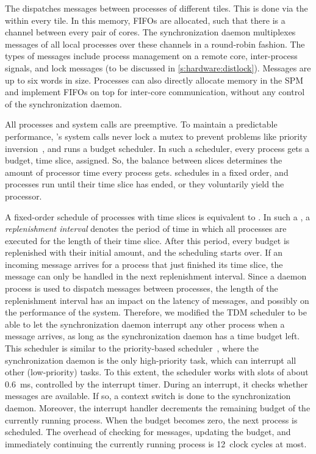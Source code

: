 The  dispatches messages between processes of different tiles.
This is done via the  within every tile.
In this memory, \acp{FIFO} are allocated, such that there is a channel between every pair of cores.
The synchronization daemon multiplexes messages of all local processes over these channels in a round-robin fashion.
The types of messages include process management on a remote core, inter-process signals, and lock messages (to be discussed in \cref{s:hardware:distlock}).
Messages are up to six words in size.
Processes can also directly allocate memory in the \ac{SPM} and implement \acp{FIFO} on top for inter-core communication, without any control of the synchronization daemon.

All processes and system calls are preemptive.
To maintain a predictable performance, \Helix's system calls never lock a mutex to prevent problems like priority inversion~\cite{sha:priority}, and \Helix runs a budget scheduler.
In such a scheduler, every process gets a budget, \ie time slice, assigned.
So, the balance between slices determines the amount of processor time every process gets.
\Helix schedules in a fixed order, and processes run until their time slice has ended, or they voluntarily yield the processor.

A fixed-order schedule of processes with time slices is equivalent to .
In such a , a \emph{replenishment interval} denotes the period of time in which all processes are executed for the length of their time slice.
After this period, every budget is replenished with their initial amount, and the scheduling starts over.
If an incoming message arrives for a process that just finished its time slice, the message can only be handled in the next replenishment interval.
Since a daemon process is used to dispatch messages between processes, the length of the replenishment interval has an impact on the latency of messages, and possibly on the performance of the system.
Therefore, we modified the \ac{TDM} scheduler to be able to let the synchronization daemon interrupt any other process when a message arrives, as long as the synchronization daemon has a time budget left.
This scheduler is similar to the priority-based scheduler~\cite{steine:pbs}, where the synchronization daemon is the only high-priority task, which can interrupt all other (low-priority) tasks.
To this extent, the scheduler works with slots of about \SI{.6}{\milli\second}, controlled by the interrupt timer.
During an interrupt, it checks whether messages are available.
If so, a context switch is done to the synchronization daemon.
Moreover, the interrupt handler decrements the remaining budget of the currently running process.
When the budget becomes zero, the next process is scheduled.
The overhead of checking for messages, updating the budget, and immediately continuing the currently running process is 12~clock cycles at most.


